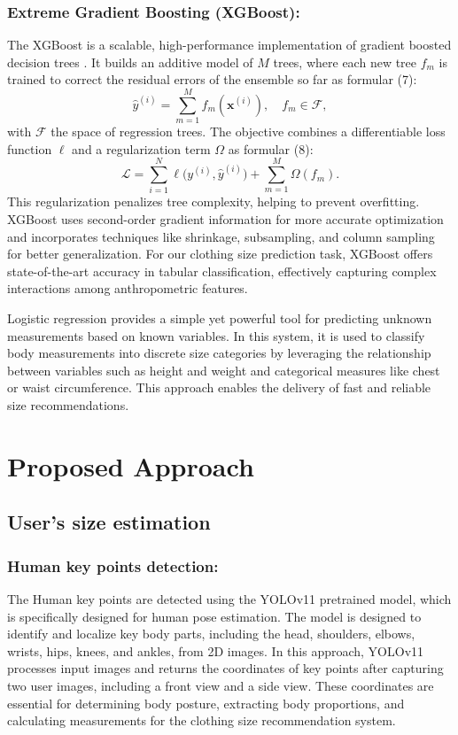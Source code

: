 \documentclass{llncs}
\begin{document}
\subsubsection{Extreme Gradient Boosting (XGBoost):} The XGBoost is a scalable, high-performance implementation of gradient boosted decision trees \cite{ref20} . 
It builds an additive model of $M$ trees, where each new tree $f_{m}$ is trained to correct the residual errors of the ensemble so far as formular (7):
\begin{equation}
\hat{y}^{(i)} = \sum_{m=1}^{M} f_{m}(\mathbf{x}^{(i)}), \quad f_{m} \in \mathcal{F},
\end{equation}
with $\mathcal{F}$ the space of regression trees. The objective combines a differentiable loss function $\ell$ and a regularization term $\Omega$ as formular (8):
\begin{equation}
\mathcal{L} = \sum_{i=1}^{N}\ell\big(y^{(i)}, \hat{y}^{(i)}\big) + \sum_{m=1}^{M}\Omega(f_{m}).
\end{equation}
This regularization penalizes tree complexity, helping to prevent overfitting. XGBoost uses second-order gradient information for more accurate optimization and incorporates techniques like shrinkage, subsampling, and column sampling for better generalization. For our clothing size prediction task, XGBoost offers state-of-the-art accuracy in tabular classification, effectively capturing complex interactions among anthropometric features.

Logistic regression provides a simple yet powerful tool for predicting unknown measurements based on known variables. 
In this system, it is used to classify body measurements into discrete size categories by leveraging the relationship between variables such as height and weight and categorical measures like chest or waist circumference. 
This approach enables the delivery of fast and reliable size recommendations.
\section{Proposed Approach}

\subsection{User's size estimation}

\subsubsection{Human key points detection:}
The Human key points are detected using the YOLOv11 pretrained model, which is specifically designed for human pose estimation. 
The model is designed to identify and localize key body parts, including the head, shoulders, elbows, wrists, hips, knees, and ankles, from 2D images. 
In this approach, YOLOv11 processes input images and returns the coordinates of key points after capturing two user images, including a front view and a side view. 
These coordinates are essential for determining body posture, extracting body proportions, and calculating measurements for the clothing size recommendation system.
\end{document}
